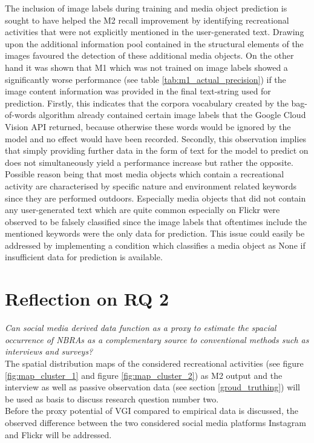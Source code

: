 The inclusion of image labels during training and media object prediction is sought to have helped the M2 recall improvement by identifying recreational activities that were not explicitly mentioned in the user-generated text. Drawing upon the additional information pool contained in the structural elements of the images favoured the detection of these additional media objects. On the other hand it was shown that M1 which was not trained on image labels showed a significantly worse performance (see table \ref{tab:m1_actual_precision}) if the image content information was provided in the final text-string used for prediction. Firstly, this indicates that the corpora vocabulary created by the bag-of-words algorithm already contained certain image labels that the Google Cloud Vision API returned, because otherwise these words would be ignored by the model and no effect would have been recorded. Secondly, this observation implies that simply providing further data in the form of text for the model to predict on does not simultaneously yield a performance increase but rather the opposite. Possible reason being that most media objects which contain a recreational activity are characterised by specific nature and environment related keywords since they are performed outdoors. Especially media objects that did not contain any user-generated text which are quite common especially on Flickr were observed to be falsely classified since the image labels that oftentimes include the mentioned keywords were the only data for prediction. This issue could easily be addressed by implementing a condition which classifies a media object as None if insufficient data for prediction is available. \\

\section{Reflection on RQ 2}\label{discussion_rq2}

\textit{Can social media derived data function as a proxy to estimate the spacial occurrence of NBRAs as a complementary source to conventional methods such as interviews and surveys?} \\

The spatial distribution maps of the considered recreational activities (see figure \ref{fig:map_cluster_1} and figure \ref{fig:map_cluster_2}) as M2 output and the interview as well as passive observation data (see section \ref{groud_truthing}) will be used as basis to discuss research question number two. \\
Before the proxy potential of VGI compared to empirical data is discussed, the observed difference between the two considered social media platforms Instagram and Flickr will be addressed.

